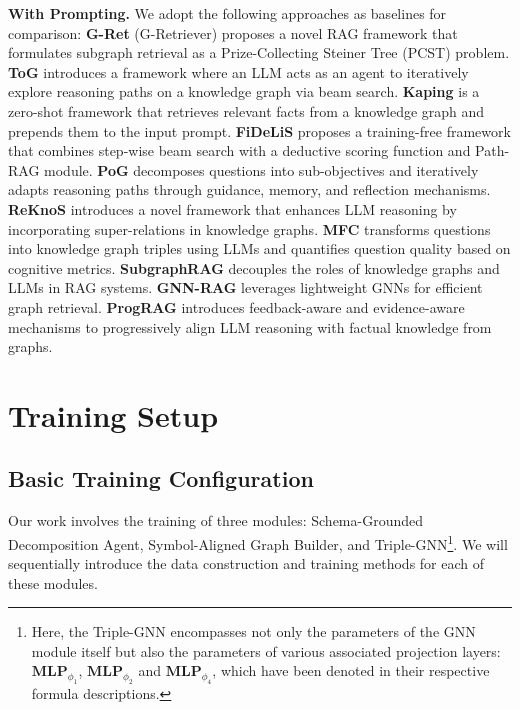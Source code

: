 \documentclass[11pt]{article}
\begin{document}
\textbf{With Prompting.}
We adopt the following approaches as baselines for comparison: \textbf{G-Ret} (G-Retriever) \cite{he2024gretriever} proposes a novel RAG framework that formulates subgraph retrieval as a Prize-Collecting Steiner Tree (PCST) problem. \textbf{ToG} \cite{sun2024thinkongraph} introduces a framework where an LLM acts as an agent to iteratively explore reasoning paths on a knowledge graph via beam search. \textbf{Kaping} \cite{baek-etal-2023-knowledge} is a zero-shot framework that retrieves relevant facts from a knowledge graph and prepends them to the input prompt. \textbf{FiDeLiS} \cite{sui-etal-2025-fidelis} proposes a training-free framework that combines step-wise beam search with a deductive scoring function and Path-RAG module. \textbf{PoG} \cite{chen2024planongraph} decomposes questions into sub-objectives and iteratively adapts reasoning paths through guidance, memory, and reflection mechanisms. \textbf{ReKnoS} \cite{sun2024think} introduces a novel framework that enhances LLM reasoning by incorporating super-relations in knowledge graphs. \textbf{MFC} \cite{zhang2025good} transforms questions into knowledge graph triples using LLMs and quantifies question quality based on cognitive metrics. \textbf{SubgraphRAG} \cite{li2024simple} decouples the roles of knowledge graphs and LLMs in RAG systems. \textbf{GNN-RAG} \cite{mavromatis-karypis-2025-gnn} leverages lightweight GNNs for efficient graph retrieval. \textbf{ProgRAG} \cite{park2025prograg} introduces feedback-aware and evidence-aware mechanisms to progressively align LLM reasoning with factual knowledge from graphs.

\section{Training Setup}
\label{sec:training}
\subsection{Basic Training Configuration}
\label{sec:basic-training}
Our work involves the training of three modules: Schema-Grounded Decomposition Agent, Symbol-Aligned Graph Builder, and Triple-GNN\footnote{Here, the Triple-GNN encompasses not only the parameters of the GNN module itself but also the parameters of various associated projection layers: 
$\mathbf{MLP}_{\phi_1}$, $\mathbf{MLP}_{\phi_2}$ and $\mathbf{MLP}_{\phi_4}$, which have been denoted in their respective formula descriptions.}. We will sequentially introduce the data construction and training methods for each of these modules. 
\end{document}
